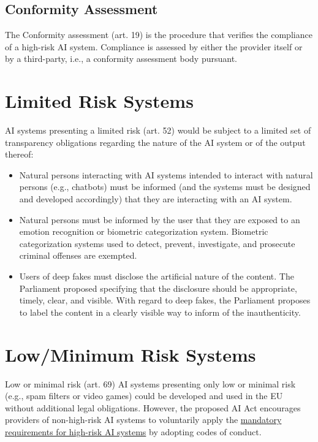 \subsection{Conformity Assessment} \label{sec:Conformity-assessment}
The Conformity assessment (art. 19) is the procedure that verifies the compliance of a high-risk AI system. Compliance is assessed by either the provider itself or by a third-party, i.e., a conformity assessment body pursuant.

\section{Limited Risk Systems} \label{sec:Limited-risk-sys}
AI systems presenting a limited risk (art. 52) would be subject to a limited set of transparency obligations regarding the nature of the AI system or of the output thereof:
\begin{itemize}
    \item Natural persons interacting with AI systems intended to interact with natural persons (e.g., chatbots) must be informed (and the systems must be designed and developed accordingly) that they are interacting with an AI system.
    \item Natural persons must be informed by the user that they are exposed to an emotion recognition or biometric categorization system. Biometric categorization systems used to detect, prevent, investigate, and prosecute criminal offenses are exempted.
    \item Users of deep fakes must disclose the artificial nature of the content. The Parliament proposed specifying that the disclosure should be appropriate, timely, clear, and visible. With regard to deep fakes, the Parliament proposes to label the content in a clearly visible way to inform of the inauthenticity.
\end{itemize}

\section{Low/Minimum Risk Systems} \label{sec:low-risk-sys}
Low or minimal risk (art. 69) AI systems presenting only low or minimal risk (e.g., spam filters or video games) could be developed and used in the EU without additional legal obligations. However, the proposed AI Act encourages providers of non-high-risk AI systems to voluntarily apply the \hyperref[sec:High-risk-req]{mandatory requirements for high-risk AI systems} by adopting codes of conduct.

